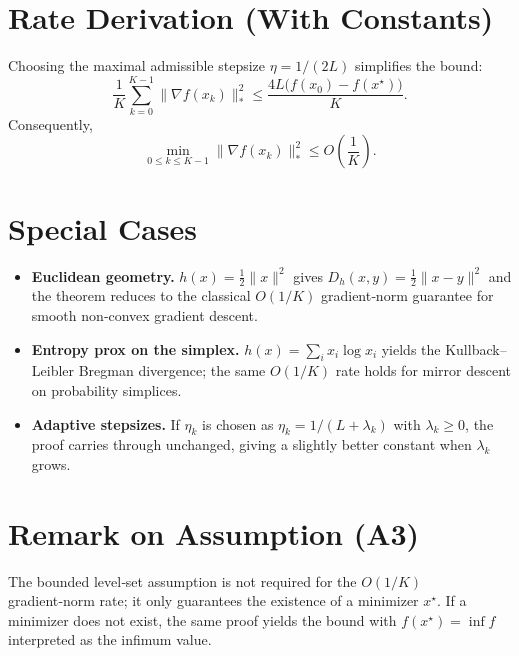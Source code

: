 \documentclass{article}
\newcommand{\breg}[2]{D_h(#1,#2)}
\begin{document}
\section*{Rate Derivation (With Constants)}
Choosing the maximal admissible stepsize $\eta=1/(2L)$ simplifies the bound:
\[
\frac{1}{K}\sum_{k=0}^{K-1}\|\nabla f(x_k)\|_{*}^{2}
\le
\frac{4L\big(f(x_0)-f(x^\star)\big)}{K}.
\]
Consequently,
\[
\min_{0\le k\le K-1}\|\nabla f(x_k)\|_{*}^{2}
\le
O\!\left(\frac{1}{K}\right).
\]

\section*{Special Cases}
\begin{itemize}
\item \textbf{Euclidean geometry.} $h(x)=\tfrac12\|x\|^{2}$ gives $\breg{x}{y}=\tfrac12\|x-y\|^{2}$ and the theorem reduces to the classical $O(1/K)$ gradient‑norm guarantee for smooth non‑convex gradient descent.
\item \textbf{Entropy prox on the simplex.} $h(x)=\sum_{i}x_i\log x_i$ yields the Kullback–Leibler Bregman divergence; the same $O(1/K)$ rate holds for mirror descent on probability simplices.
\item \textbf{Adaptive stepsizes.} If $\eta_k$ is chosen as $\eta_k=1/(L+\lambda_k)$ with $\lambda_k\ge0$, the proof carries through unchanged, giving a slightly better constant when $\lambda_k$ grows.
\end{itemize}

\section*{Remark on Assumption (A3)}
The bounded level‑set assumption is not required for the $O(1/K)$ gradient‑norm rate; it only guarantees the existence of a minimizer $x^\star$.  If a minimizer does not exist, the same proof yields the bound with $f(x^\star)=\inf f$ interpreted as the infimum value.

\end{document}
